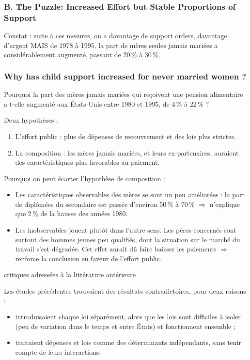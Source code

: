 \documentclass{article}
\begin{document}
 
\subsubsection*{B. The Puzzle: Increased Effort but Stable Proportions of Support}
 
Constat : suite à ces mesures, on a davantage de support orders, davantage d'argent MAIS de 1978 à 1995, la part de mères seules jamais mariées a considérablement augmenté, passant de 20\,\% à 30\,\%.
 
 
\subsubsection*{Why has child support increased for never married women ?}
 
Pourquoi la part des mères jamais mariées qui reçoivent une pension alimentaire a-t-elle augmenté aux États-Unis entre 1980 et 1995, de 4\,\% à 22\,\% ?
 
\medskip
\noindent Deux hypothèses :
\begin{enumerate}
    \item L'effort public : plus de dépenses de recouvrement et des lois plus strictes.
    \item La composition : les mères jamais mariées, et leurs ex-partenaires, auraient des caractéristiques plus favorables au paiement.
\end{enumerate}
 
\medskip
\noindent Pourquoi on peut écarter l'hypothèse de composition :
\begin{itemize}
    \item Les caractéristiques observables des mères se sont un peu améliorées : la part de diplômées du secondaire est passée d'environ 50\,\% à 70\,\% $\Rightarrow$ n'explique que 2\,\% de la hausse des années 1980.
    \item Les inobservables jouent plutôt dans l'autre sens. Les pères concernés sont surtout des hommes jeunes peu qualifiés, dont la situation sur le marché du travail s'est dégradée. Cet effet aurait dû faire baisser les paiements $\Rightarrow$ renforce la conclusion en faveur de l'effort public.
\end{itemize}
 
\medskip
\noindent critiques adressées à la littérature antérieure
 
\noindent Les études précédentes trouvaient des résultats contradictoires, pour deux raisons :
\begin{itemize}
    \item introduisaient chaque loi séparément, alors que les lois sont difficiles à isoler (peu de variation dans le temps et entre États) et fonctionnent ensemble ;
    \item traitaient dépenses et lois comme des déterminants indépendants, sans tenir compte de leurs interactions.
\end{itemize}
 
\end{document}
